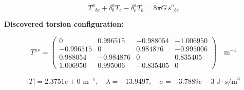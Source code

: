 
\begin{equation}
  T^a{}_{bc} + \delta^a_b T_c - \delta^a_c T_b = 8\pi G \, s^a{}_{bc}
\end{equation}

\textbf{Discovered torsion configuration:}

\begin{equation}
  T^{\mu\nu} = \begin{pmatrix}
    0 & 0.996515 & -0.988054 & -1.006950 \\
    -0.996515 & 0 & 0.984876 & -0.995006 \\
    0.988054 & -0.984876 & 0 & 0.835405 \\
    1.006950 & 0.995006 & -0.835405 & 0
  \end{pmatrix} \quad \text{m}^{-1}
\end{equation}

\begin{equation}
  |T| = 2.3751e+0 \text{ m}^{-1}, \quad
  \lambda = -13.9497, \quad
  \sigma = -3.7889e-3 \text{ J}\cdot\text{s/m}^3
\end{equation}